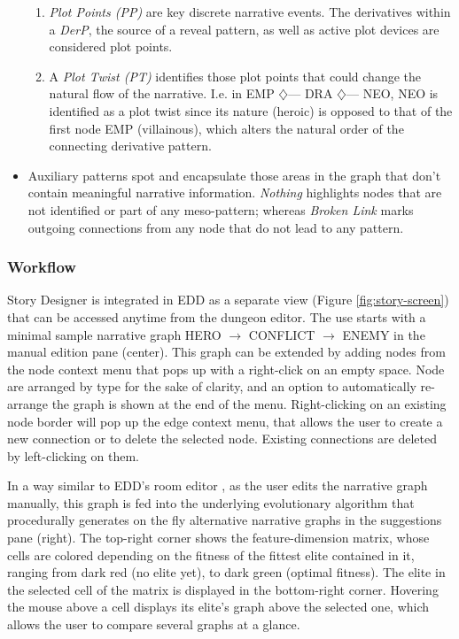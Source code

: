 \begin{itemize}
\begin{enumerate}
        \item \emph{Plot Points (PP)} are key discrete narrative events. The derivatives within a \textit{DerP}, the source of a reveal pattern, as well as active plot devices are considered plot points.
        \item A \emph{Plot Twist (PT)} identifies those plot points that could change the natural flow of the narrative. I.e. in EMP $\diamondsuit$--- DRA $\diamondsuit$--- NEO, NEO is identified as a plot twist since its nature (heroic) is opposed to that of the first node EMP (villainous), which alters the natural order of the connecting derivative pattern.
    \end{enumerate}
    \item Auxiliary patterns spot and encapsulate those areas in the graph that don't contain meaningful narrative information. \textit{Nothing} highlights nodes that are not identified or part of any meso-pattern; whereas \textit{Broken Link} marks outgoing connections from any node that do not lead to any pattern.
\end{itemize}



\subsubsection{Workflow}


Story Designer is integrated in EDD as a separate view (Figure \ref{fig:story-screen}) that can be accessed anytime from the dungeon editor. The use starts with a minimal sample narrative graph HERO $\rightarrow$ CONFLICT $\rightarrow$ ENEMY in the manual edition pane (center). This graph can be extended by adding nodes from the node context menu that pops up with a right-click on an empty space. Node are arranged by type for the sake of clarity, and an option to automatically re-arrange the graph is shown at the end of the menu. Right-clicking on an existing node border will pop up the edge context menu, that allows the user to create a new connection or to delete the selected node. Existing connections are deleted by left-clicking on them.

In a way similar to EDD's room editor , as the user edits the narrative graph manually, this graph is fed into the underlying evolutionary algorithm that procedurally generates on the fly alternative narrative graphs in the suggestions pane (right). The top-right corner shows the feature-dimension matrix, whose cells are colored depending on the fitness of the fittest elite contained in it, ranging from dark red (no elite yet), to dark green (optimal fitness). The elite in the selected cell of the matrix is displayed in the bottom-right corner. Hovering the mouse above a cell displays its elite's graph above the selected one, which allows the user to compare several graphs at a glance.    

